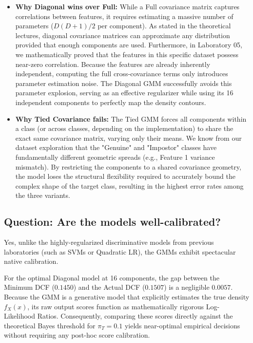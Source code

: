 \begin{itemize}
    \item \textbf{Why Diagonal wins over Full:} While a Full covariance matrix captures correlations between features, it requires estimating a massive number of parameters ($D(D+1)/2$ per component). As stated in the theoretical lectures, diagonal covariance matrices can approximate any distribution provided that enough components are used. Furthermore, in Laboratory 05, we mathematically proved that the features in this specific dataset possess near-zero correlation. Because the features are already inherently independent, computing the full cross-covariance terms only introduces parameter estimation noise. The Diagonal GMM successfully avoids this parameter explosion, serving as an effective regularizer while using its 16 independent components to perfectly map the density contours.
    
    \item \textbf{Why Tied Covariance fails:} The Tied GMM forces all components within a class (or across classes, depending on the implementation) to share the exact same covariance matrix, varying only their means. We know from our dataset exploration that the "Genuine" and "Impostor" classes have fundamentally different geometric spreads (e.g., Feature 1 variance mismatch). By restricting the components to a shared covariance geometry, the model loses the structural flexibility required to accurately bound the complex shape of the target class, resulting in the highest error rates among the three variants.
\end{itemize}

\subsection*{Question: Are the models well-calibrated?}

Yes, unlike the highly-regularized discriminative models from previous laboratories (such as SVMs or Quadratic LR), the GMMs exhibit spectacular native calibration. 

For the optimal Diagonal model at 16 components, the gap between the Minimum DCF ($0.1450$) and the Actual DCF ($0.1507$) is a negligible $0.0057$. Because the GMM is a generative model that explicitly estimates the true density $f_X(x)$, its raw output scores function as mathematically rigorous Log-Likelihood Ratios. Consequently, comparing these scores directly against the theoretical Bayes threshold for $\pi_T = 0.1$ yields near-optimal empirical decisions without requiring any post-hoc score calibration.